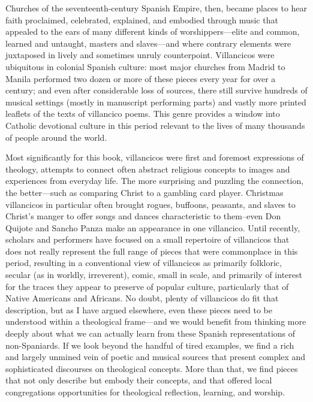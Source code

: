Churches of the seventeenth-century Spanish Empire, then, became places to hear
faith proclaimed, celebrated, explained, and embodied through music that
appealed to the ears of many different kinds of worshippers---elite and common,
learned and untaught, masters and slaves---and where contrary elements were
juxtaposed in lively and sometimes unruly counterpoint.
Villancicos were ubiquitous in colonial Spanish culture: most major churches
from Madrid to Manila performed two dozen or more of these pieces every year
for over a century; and even after considerable loss of sources, there still
survive hundreds of musical settings (mostly in manuscript performing parts)
and vastly more printed leaflets of the texts of villancico poems.
This genre provides a window into Catholic devotional culture in this period
relevant to the lives of many thousands of people around the world.

Most significantly for this book, villancicos were first and foremost
expressions of theology, attempts to connect often abstract religious concepts
to images and experiences from everyday life.
The more surprising and puzzling the connection, the better---such as comparing
Christ to a gambling card player.%
    \Autocite{Cashner:PlayingCards}
Christmas villancicos in particular often brought rogues, buffoons, peasants,
and slaves to Christ's manger to offer songs and dances characteristic to
them--even Don Quijote and Sancho Panza make an appearance in one villancico.%
Until recently, scholars and performers have focused on a small repertoire of
villancicos that does not really represent the full range of pieces
that were commonplace in this period, resulting in a conventional view of
villancicos as primarily folkloric, secular (as in worldly, irreverent), comic,
small in scale, and primarily of interest for the traces they appear to
preserve of popular culture, particularly that of Native Americans and
Africans.
No doubt, plenty of villancicos do fit that description, but as I have argued
elsewhere, even these pieces need to be understood within a theological
frame---and we would benefit from thinking more deeply about what we can
actually learn from these Spanish representations of non-Spaniards.%
    \Autocite{Cashner:BuildingSociety}
If we look beyond the handful of tired examples, we find a rich and largely
unmined vein of poetic and musical sources that present complex and
sophisticated discourses on theological concepts.
More than that, we find pieces that not only describe but embody their
concepts, and that offered local congregations opportunities for theological
reflection, learning, and worship.

